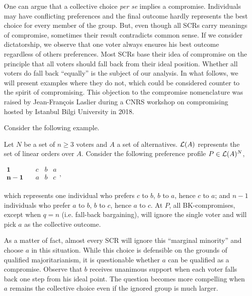 \documentclass[version=3.21, pagesize, twoside=off, bibliography=totoc, DIV=calc, fontsize=12pt, a4paper]{scrartcl}
\begin{document}
One can argue that a collective choice \emph{per se} implies a compromise. Individuals may have conflicting preferences and the final outcome hardly represents the best choice for every member of the group. But, even though all \acp{SCR} carry meanings of compromise, sometimes their result contradicts common sense. If we consider dictatorship, we observe that one voter always ensures his best outcome regardless of others preferences. Most \acp{SCR} base their idea of compromise on the principle that all voters should   fall back from their ideal position. Whether all voters do fall back “equally” is the subject of our analysis. In what follows, we will present examples where they do not, which could be considered counter to the spirit of compromising. This objection to the compromise nomenclature was raised by Jean-François Laslier during a CNRS workshop on compromising hosted by Istanbul Bilgi University in 2018.

Consider the following example.
\begin{example}
	\label{ex:ex1}
	Let $N$ be a set of $n ≥ 3$ voters and $A$ a set of alternatives. $\mathcal{L}(A)$ represents the set of linear orders over $A$. Consider the following preference profile $P\in \mathcal{L}(A)^{N}$,
	\begin{center}
		$
		\begin{array}{cccc}
		\mathbf{1} \quad &c&b&a\\
		\mathbf{n-1} \quad &a&b&c\\
		\end{array},
		$
	\end{center}
	which represents one individual who prefers $c$ to $b$, $b$ to $a$, hence $c$ to $a$; and $n-1$ individuals who prefer $a$ to $b$, $b$ to $c$, hence $a$ to $c$. At $P$, all BK-compromises, except when $q=n$ (i.e. fall-back bargaining), will ignore the single voter and will pick $a$ as the collective outcome.
\end{example}

As a matter of fact, almost every \ac{SCR} will ignore this “marginal minority” and choose $a$ in this situation. While this choice is defensible on the grounds of qualified majoritarianism, it is questionable whether $a$ can be qualified as a compromise. Observe that $b$ receives unanimous support when each voter falls back one step from his ideal point. The question becomes more compelling when $a$ remains the collective choice even if the ignored group is much larger.
\end{document}
